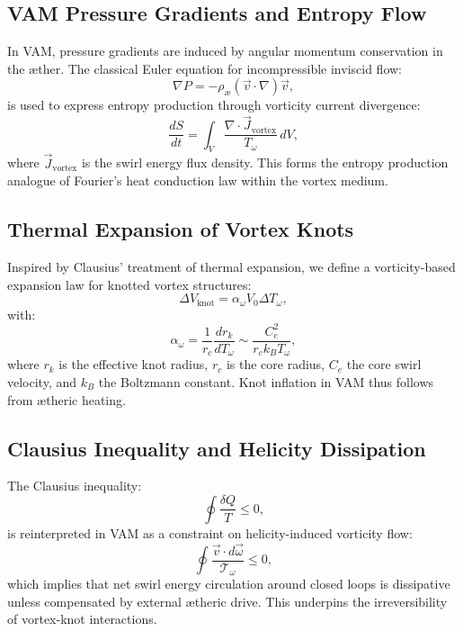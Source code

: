 \documentclass[preprint]{revtex4-2}
\begin{document}
\subsection*{VAM Pressure Gradients and Entropy Flow}

In VAM, pressure gradients are induced by angular momentum conservation in the æther. The classical Euler equation for incompressible inviscid flow:
\begin{equation}
    \nabla P = -\rho_\text{\ae} (\vec{v} \cdot \nabla) \vec{v},
\end{equation}
is used to express entropy production through vorticity current divergence:
\begin{equation}
    \frac{dS}{dt} = \int_V \frac{\nabla \cdot \vec{J}_\text{vortex}}{T_\omega} \, dV,
\end{equation}
where $\vec{J}_\text{vortex}$ is the swirl energy flux density. This forms the entropy production analogue of Fourier's heat conduction law within the vortex medium.

\subsection*{Thermal Expansion of Vortex Knots}

Inspired by Clausius' treatment of thermal expansion, we define a vorticity-based expansion law for knotted vortex structures:
\begin{equation}
    \Delta V_\text{knot} = \alpha_\omega V_0 \Delta T_\omega,
\end{equation}
with:
\begin{equation}
    \alpha_\omega = \frac{1}{r_c} \frac{d r_k}{d T_\omega} \sim \frac{C_e^2}{r_c k_B T_\omega},
\end{equation}
where $r_k$ is the effective knot radius, $r_c$ is the core radius, $C_e$ the core swirl velocity, and $k_B$ the Boltzmann constant. Knot inflation in VAM thus follows from ætheric heating.

\subsection*{Clausius Inequality and Helicity Dissipation}

The Clausius inequality:
\begin{equation}
    \oint \frac{\delta Q}{T} \leq 0,
\end{equation}
is reinterpreted in VAM as a constraint on helicity-induced vorticity flow:
\begin{equation}
    \oint \frac{\vec{v} \cdot d\vec{\omega}}{\mathcal{T}_\omega} \leq 0,
\end{equation}
which implies that net swirl energy circulation around closed loops is dissipative unless compensated by external ætheric drive. This underpins the irreversibility of vortex-knot interactions.
\end{document}
